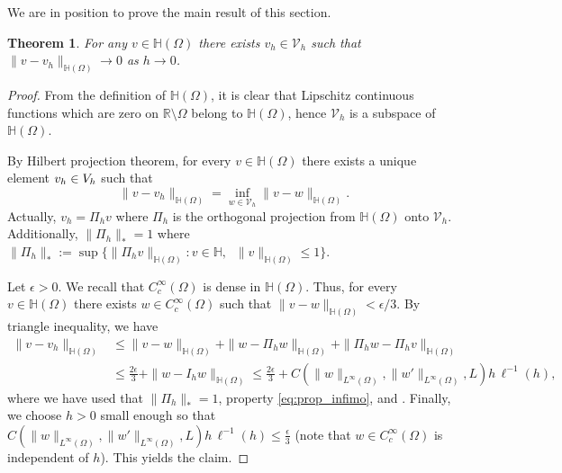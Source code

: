 \documentclass[11 pt]{article}
\newtheorem{theorem}{Theorem}[section]
\newtheorem{remark}[theorem]{Remark}
\numberwithin{equation}{section}
\def\R{\mathbb{R}}
\begin{document}

We are in position to prove the main result of this section.

\begin{theorem}\label{density:thm}
    For any $v\in\mathbb H(\Omega)$ there exists $v_h\in\mathcal V_h$ such that $\|v-v_h\|_{\mathbb H(\Omega)}\to 0$ as $h\to 0$. 
\end{theorem}

\begin{proof}
%
From the definition of $\mathbb H(\Omega)$, it is clear that Lipschitz continuous functions which are zero on $\R\setminus \Omega$ belong to $\mathbb H(\Omega)$, hence $\mathcal V_h$ is a subspace of $\mathbb H(\Omega)$.

By Hilbert projection theorem, for every $v\in\mathbb H(\Omega)$ there exists a unique element $v_h\in\mathcal \mathcal V_h$ such that
%
\begin{equation}\label{eq:prop_infimo}
    \|v-v_h\|_{\mathbb H(\Omega)}=\inf_{w\in\mathcal V_h}\|v-w\|_{\mathbb H(\Omega)}. 
\end{equation}
%
Actually, $v_h=\Pi_h v$ where $\Pi_h$ is the orthogonal projection from $\mathbb H(\Omega)$ onto $\mathcal V_h$. Additionally, $\|\Pi_h\|_*=1$ where $\|\Pi_h\|_*:=\sup\{\|\Pi_hv\|_{\mathbb H(\Omega)}: v\in\mathbb{H},\;\; \|v\|_{\mathbb H(\Omega)}\leq 1\}$.

Let $\epsilon>0$. We recall that $C_c^\infty(\Omega)$ is dense in $\mathbb H(\Omega)$. Thus, for every $v\in\mathbb H(\Omega)$ there exists $w\in C_c^\infty(\Omega)$ such that  $
    \|v-w\|_{\mathbb H(\Omega)}<\epsilon/3.$ By triangle inequality, we have
%
\begin{align*}
    \|v-v_h\|_{\mathbb H(\Omega)}&\leq \|v-w\|_{\mathbb H(\Omega)}+\|w-\Pi_h w\|_{\mathbb H(\Omega)}+\|\Pi_h w-\Pi_h v\|_{\mathbb H(\Omega)} \\
    &\leq \frac{2\epsilon}{3}+\|w-I_hw\|_{\mathbb H(\Omega)} \leq \frac{2\epsilon}{3}+{C(\|w\|_{L^\infty(\Omega)},\|w'\|_{L^\infty(\Omega)},L)}h\, \ell^{-1}(h),
\end{align*}
%
where we have used that $\|\Pi_h\|_*=1$, property \eqref{eq:prop_infimo}, and . {Finally, we choose $h>0$ small enough so that ${C(\|w\|_{L^\infty(\Omega)},\|w'\|_{L^\infty(\Omega)},L)}h\, \ell^{-1}(h)\leq \frac{\epsilon}{3}$ (note that $w\in C^\infty_c(\Omega)$ is independent of $h$)}. This yields the claim.
\end{proof}
\end{document}
